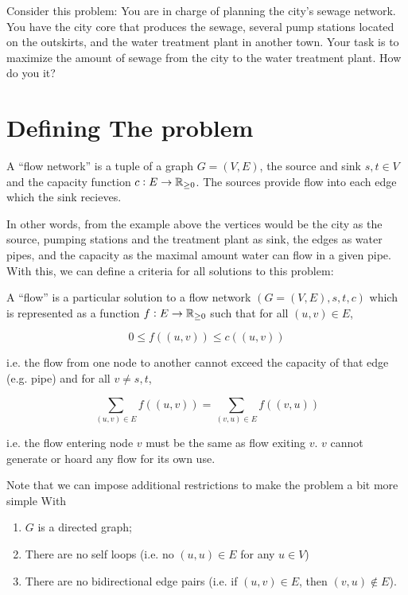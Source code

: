 Consider this problem: You are in charge of planning the city's sewage network. 
You have the city core that produces the sewage, several pump stations located on the outskirts, and the water treatment plant in another town. 
Your task is to maximize the amount of sewage from the city to the water treatment plant.
How do you it?

\section{Defining The problem}

\begin{define}
    A ``flow network'' is a tuple of a graph $G=(V,E)$, the source and sink $s,t\in V$ and the capacity function $c: E\to\mathbb{{R}}_{\ge 0}$. 
    The sources provide flow into each edge which the sink recieves.
\end{define}

In other words, from the example above the vertices would be the city as the source, pumping stations and the treatment plant as sink, the edges as water pipes, and the capacity as the maximal amount water can flow in a given pipe. 
With this, we can define a criteria for all solutions to this problem:

\begin{define}
    A ``flow'' is a particular solution to a flow network $(G=(V,E),s,t,c)$ which is represented as a function $f: E \to \mathbb{{R}}_{\ge 0}$ such that for all $(u,v)\in E$, 

    \begin{equation}
        0 \le f((u,v)) \le c((u,v))
    \end{equation}

    i.e. the flow from one node to another cannot exceed the capacity of that edge (e.g. pipe)
    and for all $v \neq s, t$, 

    \begin{equation}
        \sum_{(u,v) \in E} f((u,v)) = \sum_{(v,u) \in E} f((v,u))
    \end{equation}

    i.e. the flow entering node $v$ must be the same as flow exiting $v$.
    $v$ cannot generate or hoard any flow for its own use. 
\end{define}

Note that we can impose additional restrictions to make the problem a bit more simple With

\begin{enumerate}
    \item $G$ is a directed graph;
    \item There are no self loops (i.e. no $(u,u)\in E$ for any $u\in V$)
    \item There are no bidirectional edge pairs (i.e. if $(u,v)\in E$, then $(v,u) \notin E$).
\end{enumerate}

